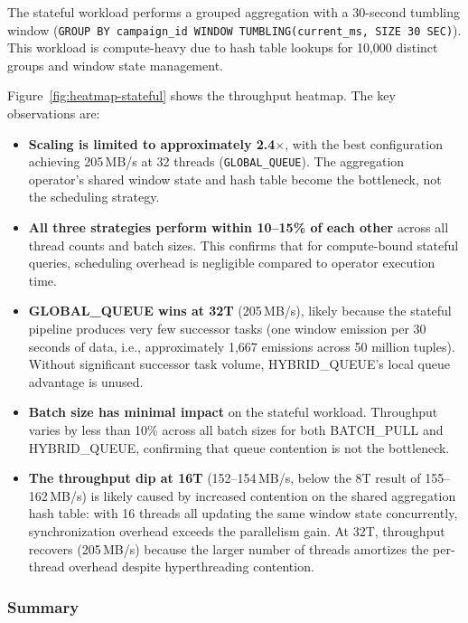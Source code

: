 The stateful workload performs a grouped aggregation with a 30-second tumbling window (\texttt{GROUP BY campaign\_id WINDOW TUMBLING(current\_ms, SIZE 30 SEC)}).
This workload is compute-heavy due to hash table lookups for 10,000 distinct groups and window state management.

Figure~\ref{fig:heatmap-stateful} shows the throughput heatmap.
The key observations are:

\begin{itemize}
    \item \textbf{Scaling is limited to approximately 2.4$\times$}, with the best configuration achieving 205\,MB/s at 32 threads (\texttt{GLOBAL\_QUEUE}).
    The aggregation operator's shared window state and hash table become the bottleneck, not the scheduling strategy.

    \item \textbf{All three strategies perform within 10--15\% of each other} across all thread counts and batch sizes.
    This confirms that for compute-bound stateful queries, scheduling overhead is negligible compared to operator execution time.

    \item \textbf{GLOBAL\_QUEUE wins at 32T} (205\,MB/s), likely because the stateful pipeline produces very few successor tasks (one window emission per 30 seconds of data, i.e., approximately 1,667 emissions across 50 million tuples).
    Without significant successor task volume, HYBRID\_QUEUE's local queue advantage is unused.

    \item \textbf{Batch size has minimal impact} on the stateful workload.
    Throughput varies by less than 10\% across all batch sizes for both BATCH\_PULL and HYBRID\_QUEUE, confirming that queue contention is not the bottleneck.

    \item \textbf{The throughput dip at 16T} (152--154\,MB/s, below the 8T result of 155--162\,MB/s) is likely caused by increased contention on the shared aggregation hash table: with 16 threads all updating the same window state concurrently, synchronization overhead exceeds the parallelism gain.
    At 32T, throughput recovers (205\,MB/s) because the larger number of threads amortizes the per-thread overhead despite hyperthreading contention.
\end{itemize}

\subsubsection{Summary}

